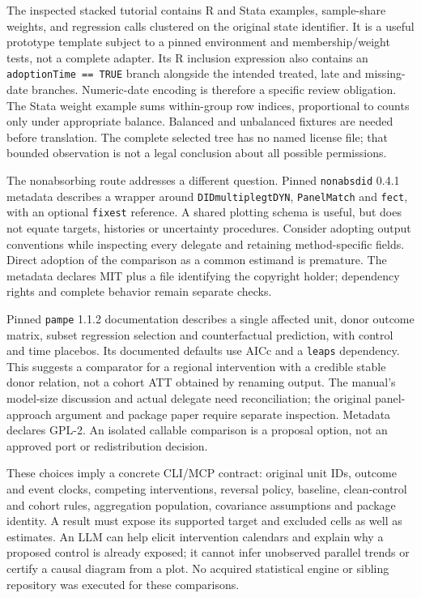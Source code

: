 The inspected stacked tutorial contains R and Stata examples, sample-share weights, and regression calls clustered on
the original state identifier. It is a useful prototype template subject to a pinned environment and membership/weight
tests, not a complete adapter. Its R inclusion expression also contains an \texttt{adoptionTime == TRUE} branch alongside
the intended treated, late and missing-date branches. Numeric-date encoding is therefore a specific review obligation.
The Stata weight example sums within-group row indices, proportional to counts only under appropriate balance.
Balanced and unbalanced fixtures are needed before translation. The complete selected tree has no named license file;
that bounded observation is not a legal conclusion about all possible permissions.~\citep{exec28_panel_software}

The nonabsorbing route addresses a different question. Pinned \texttt{nonabsdid} 0.4.1 metadata describes a wrapper around
\texttt{DIDmultiplegtDYN}, \texttt{PanelMatch} and \texttt{fect}, with an optional \texttt{fixest} reference.
A shared plotting schema is useful, but does not equate targets, histories or uncertainty procedures. Consider adopting
output conventions while inspecting every delegate and retaining method-specific fields. Direct adoption of the comparison
as a common estimand is premature. The metadata declares MIT plus a file identifying the copyright holder; dependency
rights and complete behavior remain separate checks.~\citep{exec28_panel_software}

Pinned \texttt{pampe} 1.1.2 documentation describes a single affected unit, donor outcome matrix, subset regression selection
and counterfactual prediction, with control and time placebos. Its documented defaults use AICc and a \texttt{leaps}
dependency. This suggests a comparator for a regional intervention with a credible stable donor relation, not a cohort ATT
obtained by renaming output. The manual's model-size discussion and actual delegate need reconciliation; the original
panel-approach argument and package paper require separate inspection. Metadata declares GPL-2. An isolated callable
comparison is a proposal option, not an approved port or redistribution decision.~\citep{exec28_panel_software}

These choices imply a concrete CLI/MCP contract: original unit IDs, outcome and event clocks, competing interventions,
reversal policy, baseline, clean-control and cohort rules, aggregation population, covariance assumptions and package identity.
A result must expose its supported target and excluded cells as well as estimates. An LLM can help elicit intervention
calendars and explain why a proposed control is already exposed; it cannot infer unobserved parallel trends or certify a
causal diagram from a plot. No acquired statistical engine or sibling repository was executed for these comparisons.

